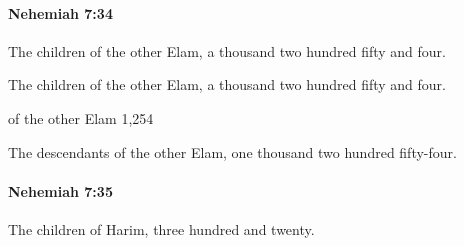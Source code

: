 		\paragraph{Nehemiah 7:34} %
			\label{NEHEMIAH-7-34}

			The children of the other Elam, a thousand two hundred fifty and four.

			\begin{versebox}
					\item[BHS] 
					\item[LXX] 
					\item[ASV] The children of the other Elam, a thousand two hundred fifty and four.
					\item[NIV] of the other Elam 1,254
					\item[NRSV] The descendants of the other Elam, one thousand two hundred fifty-four.
			\end{versebox}

		\paragraph{Nehemiah 7:35} %
			\label{NEHEMIAH-7-35}

			The children of Harim, three hundred and twenty.

